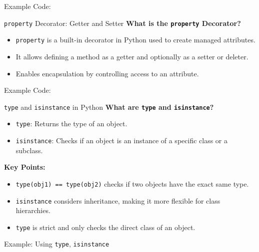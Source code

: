 \documentclass[10pt]{beamer}
\let\olditem\item
\renewcommand\item{\olditem\justifying}
\begin{document}
	\begin{frame}[fragile]{Example Code:}
		
	\end{frame}
	
	
	\begin{frame}{\texttt{property} Decorator: Getter and Setter}
		\textbf{What is the \texttt{property} Decorator?}
		\begin{itemize}
			\item \texttt{property} is a built-in decorator in Python used to create managed attributes.
			\item It allows defining a method as a getter and optionally as a setter or deleter.
			\item Enables encapsulation by controlling access to an attribute.
		\end{itemize}
	\end{frame}
	
	
	\begin{frame}[fragile]{Example Code:}
		
	\end{frame}
	
	
	\begin{frame}{\texttt{type} and \texttt{isinstance} in Python}
		\textbf{What are \texttt{type} and \texttt{isinstance}?}
		\begin{itemize}
			\item \texttt{type}: Returns the type of an object.
			\item \texttt{isinstance}: Checks if an object is an instance of a specific class or a subclass.
		\end{itemize}
		
				
		\textbf{Key Points:}
		\begin{itemize}
			\item \texttt{type(obj1) == type(obj2)} checks if two objects have the exact same type.
			\item \texttt{isinstance} considers inheritance, making it more flexible for class hierarchies.
			\item \texttt{type} is strict and only checks the direct class of an object.
		\end{itemize}


	\end{frame}
	
	\begin{frame}[fragile]{Example: Using \texttt{type}, \texttt{isinstance}}
			
	\end{frame}
	
\end{document}
